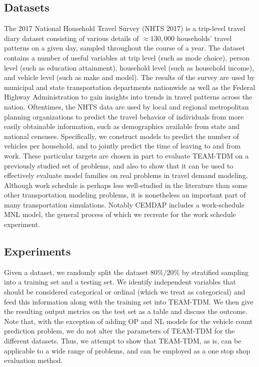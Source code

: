 \documentclass[numbered]{trbunofficial}
\begin{document}
\subsection{Datasets} \label{subsection:datasets}

The 2017 National Household Travel Survey (NHTS 2017)  is a trip-level travel diary dataset consisting of various details of $\approx 130,000$ households' travel patterns on a given day, sampled throughout the course of a year.
 The dataset contains a number of useful variables at trip level (such as mode choice), person level (such as education attainment), household level (such as household income), and vehicle level (such as make and model).
 The results of the survey are used by municipal and state transportation departments nationwide as well as the Federal Highway Administration to gain insights into trends in travel patterns across the nation.
 Oftentimes, the NHTS data are used by local and regional metropolitan planning organizations to predict the travel behavior of individuals from more easily obtainable information, such as demographics available from state and national censuses.
 Specifically, we construct models to predict the number of vehicles per household, and to jointly predict the time of leaving to and from work.
 These particular targets are chosen in part to evaluate TEAM-TDM on a previously studied set of problems, and also to show that it can be used to effectively evaluate model families on real problems in travel demand modeling.
 Although work schedule is perhaps less well-studied in the literature than some other transportation modeling problems, it is nonetheless an important part of many transportation simulations.
 Notably CEMDAP  includes a work-schedule MNL model, the general process of which we recreate for the work schedule experiment.

\subsection{Experiments} \label{subsection:experiments}

 Given a dataset, we randomly split the dataset $80\%/20\%$ by stratified sampling into a training set and a testing set.
 We identify independent variables that should be considered categorical or ordinal (which we treat as categorical) and feed this information along with the training set into TEAM-TDM.
 We then give the resulting output metrics on the test set as a table and discuss the outcome.
 Note that, with the exception of adding OP and NL models for the vehicle count prediction problem, we do not alter the parameters of TEAM-TDM for the different datasets.
 Thus, we attempt to show that TEAM-TDM, as is, can be applicable to a wide range of problems, and can be employed as a one stop shop evaluation method.
\end{document}
